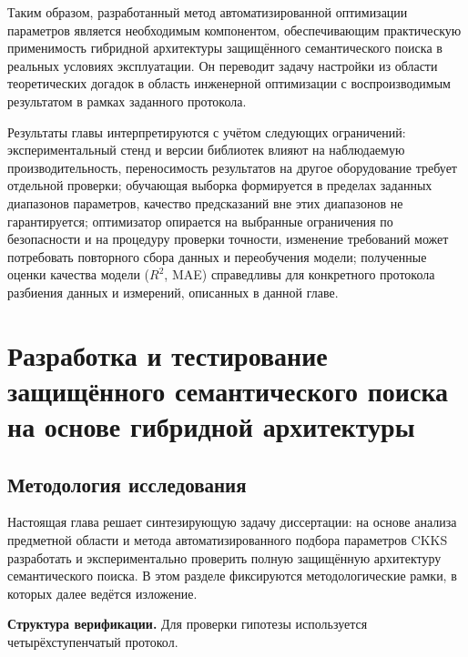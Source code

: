 \documentclass[a4paper, 12pt, oneside, openany]{article}
\newcounter{chap}
\newcommand{\chapsection}[1]{%
  \refstepcounter{chap}%
  \setcounter{equation}{0}%
  \setcounter{table}{0}%
  \setcounter{figure}{0}%
  \section{#1}%
}
\begin{document}
Таким образом, разработанный метод автоматизированной оптимизации параметров является необходимым компонентом, обеспечивающим практическую применимость гибридной архитектуры защищённого семантического поиска в реальных условиях эксплуатации. Он переводит задачу настройки из области теоретических догадок в область инженерной оптимизации с воспроизводимым результатом в рамках заданного протокола.

Результаты главы интерпретируются с учётом следующих ограничений: экспериментальный стенд и версии библиотек влияют на наблюдаемую производительность, переносимость результатов на другое оборудование требует отдельной проверки; обучающая выборка формируется в пределах заданных диапазонов параметров, качество предсказаний вне этих диапазонов не гарантируется; оптимизатор опирается на выбранные ограничения по безопасности и на процедуру проверки точности, изменение требований может потребовать повторного сбора данных и переобучения модели; полученные оценки качества модели ($R^{2}$, MAE) справедливы для конкретного протокола разбиения данных и измерений, описанных в данной главе.


\chapsection{Разработка и тестирование защищённого семантического поиска на основе гибридной архитектуры}

\subsection{Методология исследования}

Настоящая глава решает синтезирующую задачу диссертации: на основе анализа предметной области и метода автоматизированного подбора параметров CKKS  разработать и экспериментально проверить полную защищённую архитектуру семантического поиска. В этом разделе фиксируются методологические рамки, в которых далее ведётся изложение.


\textbf{Структура верификации.} Для проверки гипотезы используется четырёхступенчатый протокол.
\end{document}
